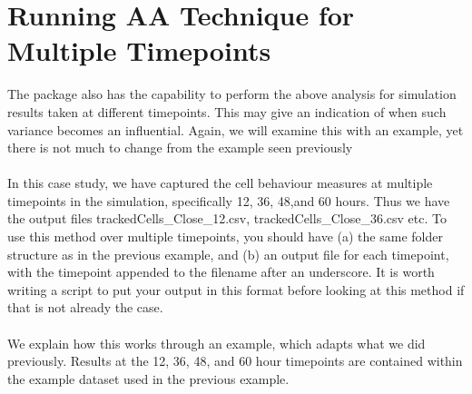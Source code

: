 \documentclass[a4paper,11pt]{article}
\begin{document}
\section{Running AA Technique for Multiple Timepoints}
\noindent The package also has the capability to perform the above analysis for simulation results taken at different timepoints. This may give an indication of when such variance becomes an influential.  Again, we will examine this with an example, yet there is not much to change from the example seen previously\\
\\
In this case study, we have captured the cell behaviour measures at multiple timepoints in the simulation, specifically 12, 36, 48,and 60 hours.  Thus we have the output files trackedCells\_Close\_12.csv, trackedCells\_Close\_36.csv etc. To use this method over multiple timepoints, you should have (a) the same folder structure as in the previous example, and (b) an output file for each timepoint, with the timepoint appended to the filename after an underscore. It is worth writing a script to put your output in this format before looking at this method if that is not already the case.\\
\\
We explain how this works through an example, which adapts what we did previously. Results at the 12, 36, 48, and 60 hour timepoints are contained within the example dataset used in the previous example.
\end{document}
